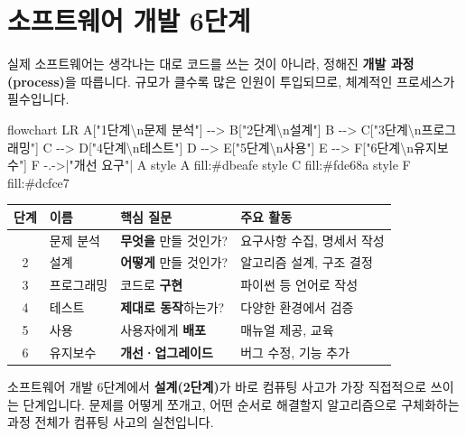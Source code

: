 \documentclass[
  korean,
  11pt,
  a4paper,
  DIV=11,
  numbers=noendperiod]{scrreprt}
\newenvironment{Shaded}{\begin{snugshade}}{\end{snugshade}}
\newcommand{\NormalTok}[1]{\textcolor[rgb]{0.00,0.23,0.31}{#1}}
\newcounter{none} %
\begin{document}
\section{소프트웨어 개발 6단계}\label{sec-sw-dev}

실제 소프트웨어는 생각나는 대로 코드를 쓰는 것이 아니라, 정해진
\textbf{개발 과정(process)}을 따릅니다. 규모가 클수록 많은 인원이
투입되므로, 체계적인 프로세스가 필수입니다.

\begin{Shaded}
\begin{Highlighting}[]
\NormalTok{flowchart LR}
\NormalTok{    A["1단계\textbackslash{}n문제 분석"] {-}{-}\textgreater{} B["2단계\textbackslash{}n설계"]}
\NormalTok{    B {-}{-}\textgreater{} C["3단계\textbackslash{}n프로그래밍"]}
\NormalTok{    C {-}{-}\textgreater{} D["4단계\textbackslash{}n테스트"]}
\NormalTok{    D {-}{-}\textgreater{} E["5단계\textbackslash{}n사용"]}
\NormalTok{    E {-}{-}\textgreater{} F["6단계\textbackslash{}n유지보수"]}
\NormalTok{    F {-}.{-}\textgreater{}|"개선 요구"| A}
\NormalTok{    style A fill:\#dbeafe}
\NormalTok{    style C fill:\#fde68a}
\NormalTok{    style F fill:\#dcfce7}
\end{Highlighting}
\end{Shaded}

{\def\LTcaptype{none} %
\begin{longtable}[]{@{}clll@{}}
\toprule\noalign{}
단계 & 이름 & 핵심 질문 & 주요 활동 \\
\midrule\noalign{}
\endhead
\bottomrule\noalign{}
\endlastfoot
1 & 문제 분석 & \textbf{무엇을} 만들 것인가? & 요구사항 수집, 명세서
작성 \\
2 & 설계 & \textbf{어떻게} 만들 것인가? & 알고리즘 설계, 구조 결정 \\
3 & 프로그래밍 & 코드로 \textbf{구현} & 파이썬 등 언어로 작성 \\
4 & 테스트 & \textbf{제대로 동작}하는가? & 다양한 환경에서 검증 \\
5 & 사용 & 사용자에게 \textbf{배포} & 매뉴얼 제공, 교육 \\
6 & 유지보수 & \textbf{개선·업그레이드} & 버그 수정, 기능 추가 \\
\end{longtable}
}

\begin{tcolorbox}[enhanced jigsaw, arc=.35mm, bottomrule=.15mm, bottomtitle=1mm, breakable, colback=white, colbacktitle=quarto-callout-important-color!10!white, colframe=quarto-callout-important-color-frame, coltitle=black, left=2mm, leftrule=.75mm, opacityback=0, opacitybacktitle=0.6, rightrule=.15mm, title=\textcolor{quarto-callout-important-color}{\faExclamation}\hspace{0.5em}{2단계 설계 = 컴퓨팅 사고의 실천}, titlerule=0mm, toprule=.15mm, toptitle=1mm]

소프트웨어 개발 6단계에서 \textbf{설계(2단계)}가 바로 컴퓨팅 사고가 가장
직접적으로 쓰이는 단계입니다. 문제를 어떻게 쪼개고, 어떤 순서로 해결할지
알고리즘으로 구체화하는 과정 전체가 컴퓨팅 사고의 실천입니다.

\end{tcolorbox}
\end{document}
